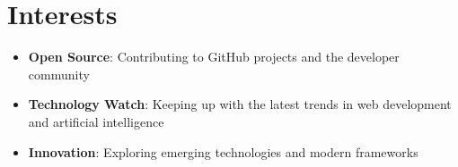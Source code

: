 
\section{Interests}

\begin{itemize}
    \item \textbf{Open Source}: Contributing to GitHub projects and the developer community
    \item \textbf{Technology Watch}: Keeping up with the latest trends in web development and artificial intelligence
    \item \textbf{Innovation}: Exploring emerging technologies and modern frameworks
\end{itemize}
